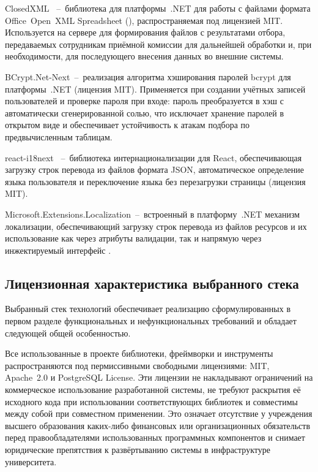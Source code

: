 ClosedXML ~--~библиотека для платформы~.NET для работы с файлами формата Office~Open~XML Spreadsheet (), распространяемая под лицензией MIT.
Используется на сервере для формирования файлов с результатами отбора, передаваемых сотрудникам приёмной комиссии для дальнейшей обработки и, при необходимости, для последующего внесения данных во внешние системы.

BCrypt.Net-Next~--~реализация алгоритма хэширования паролей bcrypt для платформы~.NET (лицензия MIT).
Применяется при создании учётных записей пользователей и проверке пароля при входе: пароль преобразуется в хэш с автоматически сгенерированной солью, что исключает хранение паролей в открытом виде и обеспечивает устойчивость к атакам подбора по предвычисленным таблицам.

react-i18next ~--~библиотека интернационализации для React, обеспечивающая загрузку строк перевода из файлов формата JSON, автоматическое определение языка пользователя и переключение языка без перезагрузки страницы (лицензия MIT).

Microsoft.Extensions.Localization~--~встроенный в платформу~.NET механизм локализации, обеспечивающий загрузку строк перевода из файлов ресурсов  и их использование как через атрибуты валидации, так и напрямую через инжектируемый интерфейс .

\subsection{Лицензионная характеристика выбранного стека}

Выбранный стек технологий обеспечивает реализацию сформулированных в первом разделе функциональных и нефункциональных требований и обладает следующей общей особенностью.

Все использованные в проекте библиотеки, фреймворки и инструменты распространяются под пермиссивными свободными лицензиями: MIT, Apache~2.0 и PostgreSQL License.
Эти лицензии не накладывают ограничений на коммерческое использование разработанной системы, не требуют раскрытия её исходного кода при использовании соответствующих библиотек и совместимы между собой при совместном применении.
Это означает отсутствие у учреждения высшего образования каких-либо финансовых или организационных обязательств перед правообладателями использованных программных компонентов и снимает юридические препятствия к развёртыванию системы в инфраструктуре университета.
